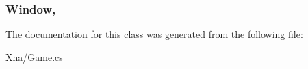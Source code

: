 \subsubsection[{Window}]{ Window\hspace{0.3cm}{\ttfamily [get]}, {\ttfamily [set]}}\label{classMicrosoft_1_1Xna_1_1Framework_1_1Game_aa30ead538db6766e57e95afda44df630}


The documentation for this class was generated from the following file\+:\begin{DoxyCompactItemize}
\item 
Xna/\hyperlink{Game_8cs}{Game.\+cs}\end{DoxyCompactItemize}
